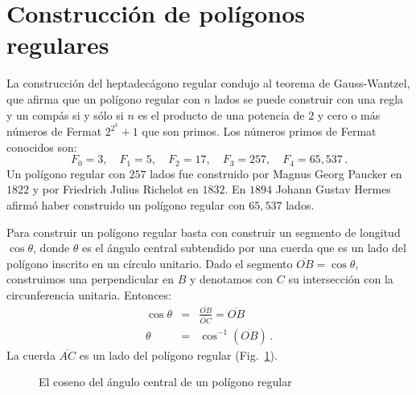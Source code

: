 \section{Construcción de polígonos regulares}\label{s.hept-regular}

La construcción del heptadecágono regular condujo al teorema de Gauss-Wantzel, que afirma que un polígono regular con $n$ lados se puede construir con una regla y un compás si y sólo si $n$ es el producto de una potencia de $2$ y cero o más números de Fermat $2^{2^k}+1$ que son primos. Los números primos de Fermat conocidos son:
\[
F_0=3,\quad F_1=5,\quad F_2=17,\quad F_3=257,\quad F_4=65,537\,.
\]
Un polígono regular con $257$ lados fue construido por Magnus Georg Paucker en $1822$ y por Friedrich Julius Richelot en $1832$. En $1894$ Johann Gustav Hermes afirmó haber construido un polígono regular con $65,537$ lados.

Para construir un polígono regular basta con construir un segmento de longitud $\cos \theta$, donde $\theta$ es el ángulo central subtendido por una cuerda que es un lado del polígono inscrito en un círculo unitario. Dado el segmento $\overline{OB}=\cos\theta$, construimos una perpendicular en $B$ y denotamos con $C$ su intersección con la circunferencia unitaria. Entonces:
\begin{eqnarray*}
\cos \theta&=&\displaystyle\frac{\overline{OB}}{\overline{OC}}=\overline{OB}\\
\theta &=& \cos^{-1} (\overline{OB})\,.
\end{eqnarray*}
La cuerda $\overline{AC}$ es un lado del polígono regular (Fig.~\ref{f.hept-central1}).
\begin{figure}[b]
\begin{center}
\end{center}
\caption{El coseno del ángulo central de un polígono regular}\label{f.hept-central1}
\end{figure}

